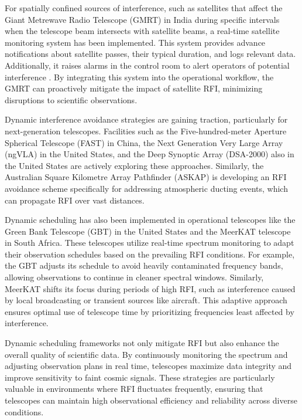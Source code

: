 For spatially confined sources of interference, such as satellites that affect the Giant Metrewave Radio Telescope (GMRT) in India during specific intervals when the telescope beam intersects with satellite beams, a real-time satellite monitoring system has been implemented. This system provides advance notifications about satellite passes, their typical duration, and logs relevant data. Additionally, it raises alarms in the control room to alert operators of potential interference \citep{raybole2016real}. By integrating this system into the operational workflow, the GMRT can proactively mitigate the impact of satellite RFI, minimizing disruptions to scientific observations.

Dynamic interference avoidance strategies are gaining traction, particularly for next-generation telescopes. Facilities such as the Five-hundred-meter Aperture Spherical Telescope (FAST) in China, the Next Generation Very Large Array (ngVLA) in the United States, and the Deep Synoptic Array (DSA-2000) also in the United States are actively exploring these approaches. Similarly, the Australian Square Kilometre Array Pathfinder (ASKAP) is developing an RFI avoidance scheme specifically for addressing atmospheric ducting events, which can propagate RFI over vast distances.

Dynamic scheduling has also been implemented in operational telescopes like the Green Bank Telescope (GBT) in the United States and the MeerKAT telescope in South Africa. These telescopes utilize real-time spectrum monitoring to adapt their observation schedules based on the prevailing RFI conditions. For example, the GBT adjusts its schedule to avoid heavily contaminated frequency bands, allowing observations to continue in cleaner spectral windows. Similarly, MeerKAT shifts its focus during periods of high RFI, such as interference caused by local broadcasting or transient sources like aircraft. This adaptive approach ensures optimal use of telescope time by prioritizing frequencies least affected by interference.

Dynamic scheduling frameworks not only mitigate RFI but also enhance the overall quality of scientific data. By continuously monitoring the spectrum and adjusting observation plans in real time, telescopes maximize data integrity and improve sensitivity to faint cosmic signals. These strategies are particularly valuable in environments where RFI fluctuates frequently, ensuring that telescopes can maintain high observational efficiency and reliability across diverse conditions.

